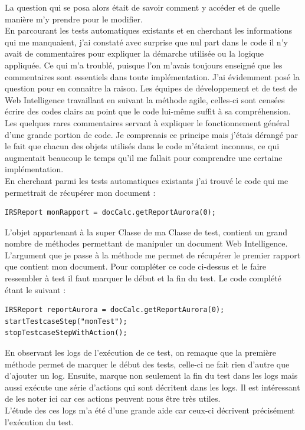 La question qui se posa alors \'{e}tait de savoir comment y acc\'{e}der et de quelle mani\`{e}re m'y prendre pour le modifier.\\
En parcourant les tests automatiques existants et en cherchant les informations qui me manquaient, j'ai constat\'{e} avec surprise que nul part dans le code il n'y avait de commentaires pour expliquer la d\'{e}marche utilis\'{e}e ou la logique appliqu\'{e}e. Ce qui m'a troubl\'{e}, puisque l'on m'avais toujours enseign\'{e} que les commentaires sont essentiels dans toute impl\'{e}mentation. J'ai \'{e}videmment pos\'{e} la question pour en connaitre la raison. Les \'{e}quipes de d\'{e}veloppement et de test de Web Intelligence travaillant en suivant la m\'{e}thode agile, celles-ci sont cens\'{e}es \'{e}crire des codes clairs au point que le code lui-m\^{e}me suffit \`{a} sa compr\'{e}hension. Les quelques rares commentaires servant \`{a} expliquer le fonctionnement g\'{e}n\'{e}ral d'une grande portion de code. Je comprenais ce principe mais j'\'{e}tais d\'{e}rang\'{e} par le fait que chacun des objets utilis\'{e}s dans le code m'\'{e}taient inconnus, ce qui augmentait beaucoup le temps qu'il me fallait pour comprendre une certaine impl\'{e}mentation.\\ 

En cherchant parmi les tests automatiques existants j'ai trouv\'{e} le code qui me permettrait de r\'{e}cup\'{e}rer mon document :
\begin{lstlisting}
IRSReport monRapport = docCalc.getReportAurora(0);
\end{lstlisting}

L'objet  appartenant \`{a} la super \gls{Classe} de ma \gls{Classe} de test, contient un grand nombre de m\'{e}thodes permettant de manipuler un document Web Intelligence. L'argument  que je passe \`{a} la m\'{e}thode me permet de r\'{e}cup\'{e}rer le premier rapport que contient mon document. Pour compl\'{e}ter ce code ci-dessus et le faire ressembler \`{a} test il faut marquer le d\'{e}but et la fin du test. Le code compl\'{e}t\'{e} \'{e}tant le suivant :


\begin{lstlisting}
IRSReport reportAurora = docCalc.getReportAurora(0);
startTestcaseStep("monTest");
stopTestcaseStepWithAction();
\end{lstlisting}
 
En observant les logs de l'ex\'{e}cution de ce test, on remaque que la premi\`{e}re m\'{e}thode  permet de marquer le d\'{e}but des tests, celle-ci ne fait rien d'autre que d'ajouter un log. Ensuite,  marque non seulement la fin du test dans les logs mais aussi ex\'{e}cute une s\'{e}rie d'actions qui sont d\'{e}critent dans les logs. Il est int\'{e}ressant de les noter ici car ces actions peuvent nous \^{e}tre tr\`{e}s utiles.\\
L'\'{e}tude des ces logs m'a \'{e}t\'{e} d'une grande aide car ceux-ci d\'{e}crivent pr\'{e}cis\'{e}ment l'ex\'{e}cution du test.\\




